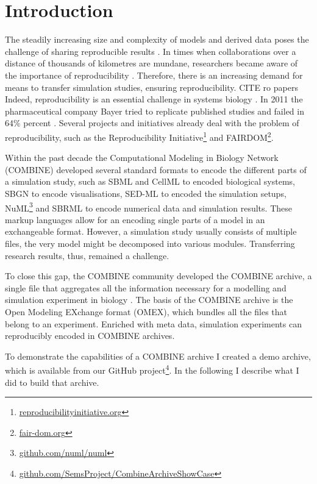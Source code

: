 
\section{Introduction}

The steadily increasing size and complexity of models and derived data poses the challenge of sharing reproducible results \cite{scharm2014}.
In times when collaborations over a distance of thousands of kilometres are mundane, researchers became aware of the importance of reproducibility \cite{Sandve2013}.
Therefore, there is an increasing demand for means to transfer simulation studies, ensuring reproducibility. CITE ro papers
Indeed, reproducibility is an essential challenge in systems biology \cite{Mesirov2010}.
In 2011 the pharmaceutical company Bayer tried to replicate published studies and failed in 64\% percent \cite{Prinz2011}.
Several projects and initiatives already deal with the problem of reproducibility, such as the Reproducibility Initiative\footnote{\href{http://reproducibilityinitiative.org/}{reproducibilityinitiative.org}} and FAIRDOM\footnote{\href{http://fair-dom.org/}{fair-dom.org}}.

Within the past decade the Computational Modeling in Biology Network (COMBINE) developed several standard formats to encode the different parts of a simulation study, such as SBML \cite{Hucka2003} and CellML \cite{Cuellar2003a} to encoded biological systems, SBGN \cite{sbgn} to encode visualisations, SED-ML \cite{Waltemath2011} to encoded the simulation setups, NuML\footnote{\href{https://github.com/numl/numl}{github.com/numl/numl}} and SBRML \cite{Dada2010} to encode numerical data and simulation results.
These markup languages allow for an encoding single parts of a model in an exchangeable format.
However, a simulation study usually consists of multiple files, the very model might be decomposed into various modules.
Transferring research results, thus, remained a challenge.

To close this gap, the COMBINE community developed the COMBINE archive, a single file that aggregates all the information necessary for a modelling and simulation experiment in biology \cite{Bergmann2014}.
The basis of the COMBINE archive is the Open Modeling EXchange format (OMEX), which bundles all the files that belong to an experiment.
Enriched with meta data, simulation experiments can reproducibly encoded in COMBINE archives.

To demonstrate the capabilities of a COMBINE archive I created a demo archive, which is available from our GitHub project\footnote{\href{https://github.com/SemsProject/CombineArchiveShowCase}{github.com/SemsProject/CombineArchiveShowCase}}.
In the following I describe what I did to build that archive.

